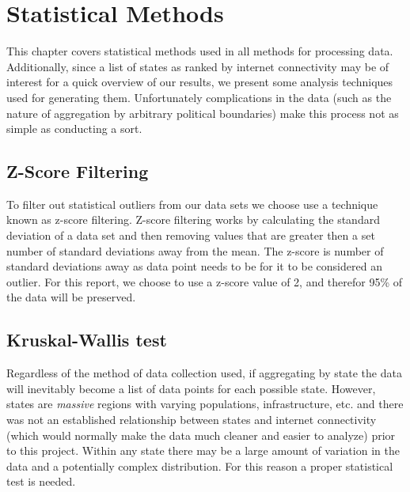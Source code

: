 \section{Statistical Methods}\label{sec:stats_methods}
This chapter covers statistical methods used in all methods for processing data. Additionally, since a list of states as ranked by internet connectivity may be of interest for a quick overview of our results, we present some analysis techniques used for generating them. Unfortunately  complications in the data (such as the nature of aggregation by arbitrary political boundaries) make this process not as simple as conducting a sort.

\subsection{Z-Score Filtering} \label{sec:z-score-filtering}

To filter out statistical outliers from our data sets we choose use a technique known as z-score filtering. Z-score filtering works by calculating the standard deviation of a data set and then removing values that are greater then a set number of standard deviations away from the mean. The z-score is number of standard deviations away as data point needs to be for it to be considered an outlier. For this report, we choose to use a z-score value of 2, and therefor 95\% of the data will be preserved.

\subsection{Kruskal-Wallis test}

Regardless of the method of data collection used, if aggregating by state the data will inevitably become a list of data points for each possible state. However, states are \textit{massive} regions with varying populations, infrastructure, etc. and there was not an established relationship between states and internet connectivity (which would normally make the data much cleaner and easier to analyze) prior to this project. Within any state there may be a large amount of variation in the data and a potentially complex distribution. For this reason a proper statistical test is needed.

